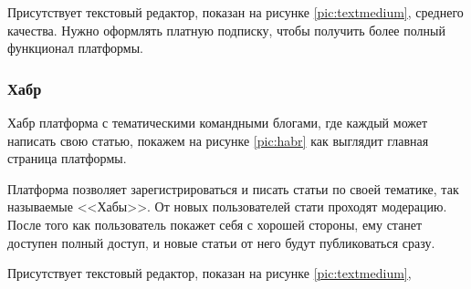 
Присутствует текстовый редактор, показан на рисунке \ref{pic:textmedium}, среднего качества. Нужно оформлять платную подписку, чтобы получить более полный функционал платформы.


\subsubsection{Хабр}

Хабр платформа с тематическими командными блогами, где каждый может написать свою статью, покажем на рисунке \ref{pic:habr} как выглядит главная страница платформы.


Платформа позволяет зарегистрироваться и писать статьи по своей тематике, так называемые <<Хабы>>. От новых пользователей стати проходят модерацию. После того как пользователь покажет себя с хорошей стороны, ему станет доступен полный доступ, и новые статьи от него будут публиковаться сразу.
  
Присутствует текстовый редактор, показан на рисунке \ref{pic:textmedium},
\pagebreak